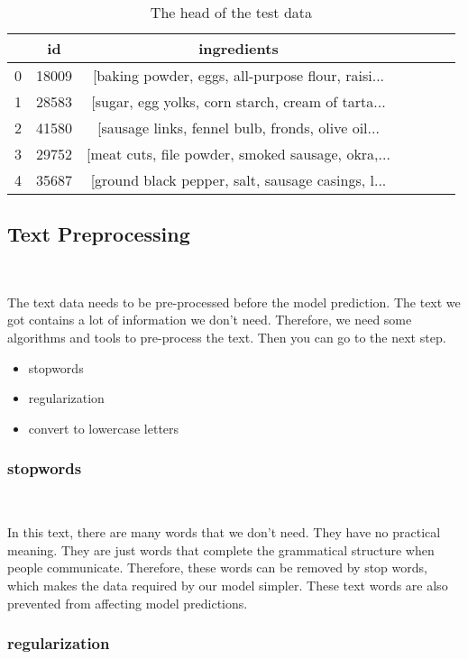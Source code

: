\begin{table}[htbp]  \centering
    \caption{The head of the test data}
    \label{tbl:data information}
    \begin{tabular}{ccccccc}
      & id & ingredients\\
      \hline
      0  & 18009 & [baking powder, eggs, all-purpose flour, raisi... \\
      1  & 28583 & [sugar, egg yolks, corn starch, cream of tarta... \\
      2  & 41580 & [sausage links, fennel bulb, fronds, olive oil... \\
      3  & 29752 & [meat cuts, file powder, smoked sausage, okra,... \\
      4  & 35687 & [ground black pepper, salt, sausage casings, l... \\
      \hline 
    \end{tabular}
  \end{table}

\subsection{Text Preprocessing}
\

The text data needs to be pre-processed before the model prediction.
The text we got contains a lot of information we don't need. Therefore,
we need some algorithms and tools to pre-process the text. Then you can go to the next step.

\begin{itemize}
	\item stopwords
	\item regularization
	\item convert to lowercase letters
  \end{itemize}
\subsubsection{stopwords}
\

In this text, there are many words that we don't need. They have no practical meaning. 
They are just words that complete the grammatical structure when people communicate. 
Therefore, these words can be removed by stop words, which makes the data required by 
our model simpler. These text words are also prevented from affecting model predictions.

\subsubsection{regularization}
\

